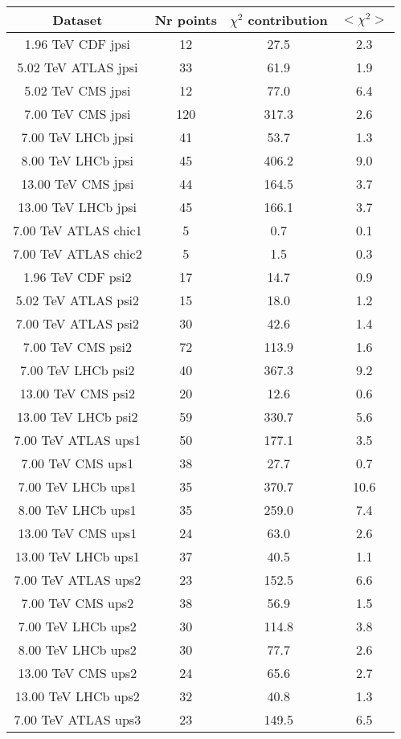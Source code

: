 \begin{table}[h!]
\centering
\begin{tabular}{c|c|c|c}
Dataset & Nr points & $\chi^2$ contribution & $<\chi^2>$ \\
\hline
1.96 TeV CDF jpsi & 12 & 27.5 & 2.3 \\
5.02 TeV ATLAS jpsi & 33 & 61.9 & 1.9 \\
5.02 TeV CMS jpsi & 12 & 77.0 & 6.4 \\
7.00 TeV CMS jpsi & 120 & 317.3 & 2.6 \\
7.00 TeV LHCb jpsi & 41 & 53.7 & 1.3 \\
8.00 TeV LHCb jpsi & 45 & 406.2 & 9.0 \\
13.00 TeV CMS jpsi & 44 & 164.5 & 3.7 \\
13.00 TeV LHCb jpsi & 45 & 166.1 & 3.7 \\
7.00 TeV ATLAS chic1 & 5 & 0.7 & 0.1 \\
7.00 TeV ATLAS chic2 & 5 & 1.5 & 0.3 \\
1.96 TeV CDF psi2 & 17 & 14.7 & 0.9 \\
5.02 TeV ATLAS psi2 & 15 & 18.0 & 1.2 \\
7.00 TeV ATLAS psi2 & 30 & 42.6 & 1.4 \\
7.00 TeV CMS psi2 & 72 & 113.9 & 1.6 \\
7.00 TeV LHCb psi2 & 40 & 367.3 & 9.2 \\
13.00 TeV CMS psi2 & 20 & 12.6 & 0.6 \\
13.00 TeV LHCb psi2 & 59 & 330.7 & 5.6 \\
7.00 TeV ATLAS ups1 & 50 & 177.1 & 3.5 \\
7.00 TeV CMS ups1 & 38 & 27.7 & 0.7 \\
7.00 TeV LHCb ups1 & 35 & 370.7 & 10.6 \\
8.00 TeV LHCb ups1 & 35 & 259.0 & 7.4 \\
13.00 TeV CMS ups1 & 24 & 63.0 & 2.6 \\
13.00 TeV LHCb ups1 & 37 & 40.5 & 1.1 \\
7.00 TeV ATLAS ups2 & 23 & 152.5 & 6.6 \\
7.00 TeV CMS ups2 & 38 & 56.9 & 1.5 \\
7.00 TeV LHCb ups2 & 30 & 114.8 & 3.8 \\
8.00 TeV LHCb ups2 & 30 & 77.7 & 2.6 \\
13.00 TeV CMS ups2 & 24 & 65.6 & 2.7 \\
13.00 TeV LHCb ups2 & 32 & 40.8 & 1.3 \\
7.00 TeV ATLAS ups3 & 23 & 149.5 & 6.5 \\

\end{tabular}
\end{table}

